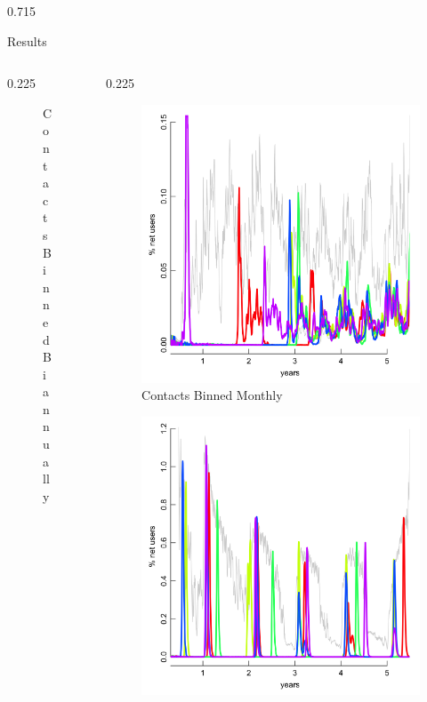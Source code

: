 \documentclass[final]{beamer} %
\newcommand{\spaceProp}{0.02}
\newcommand{\spacer}{\begin{column}{\spaceProp\paperwidth}\end{column}}
\newenvironment{oneCol}{\begin{column}[t]{0.225\paperwidth}}{\end{column}}
\newenvironment{threeCol}{\begin{column}[t]{0.715\paperwidth}}{\end{column}}
\begin{document}
\begin{frame}{}
\begin{columns}[t]
\begin{threeCol}
\begin{block}{Results}
\begin{columns}
\begin{oneCol}
\begin{figure}
        \caption{Contacts Binned Biannually}
      \end{figure}  
    \end{oneCol}
    \begin{oneCol}
      \setcounter{figure}{2}
      \begin{figure}
        \caption{Contacts Binned Monthly}
        \includegraphics[width=1.0\linewidth]{out30.png}
      \end{figure}
      \setcounter{figure}{5}
      \begin{figure}
        \includegraphics[width=1.0\linewidth]{out365.png}

\end{figure}
\end{oneCol}
\end{columns}
\end{block}
\end{threeCol}
\end{columns}
\end{frame}
\end{document}
